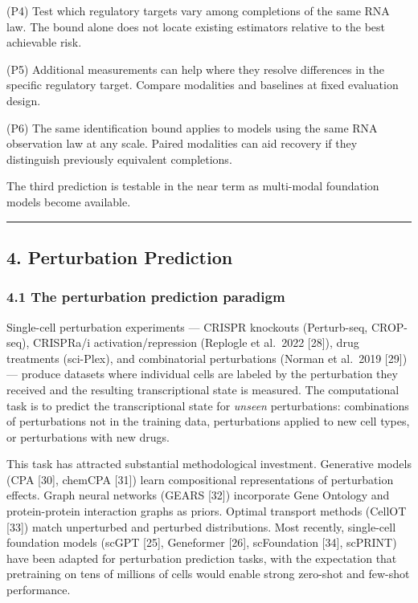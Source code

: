 \documentclass[
]{article}
\begin{document}
(P4) Test which regulatory targets vary among completions of the same
RNA law. The bound alone does not locate existing estimators relative to
the best achievable risk.

(P5) Additional measurements can help where they resolve differences in
the specific regulatory target. Compare modalities and baselines at
fixed evaluation design.

(P6) The same identification bound applies to models using the same RNA
observation law at any scale. Paired modalities can aid recovery if they
distinguish previously equivalent completions.

The third prediction is testable in the near term as multi-modal
foundation models become available.

\begin{center}\rule{0.5\linewidth}{0.5pt}\end{center}

\hypertarget{perturbation-prediction}{%
\subsection{4. Perturbation Prediction}\label{perturbation-prediction}}

\hypertarget{the-perturbation-prediction-paradigm}{%
\subsubsection{4.1 The perturbation prediction
paradigm}\label{the-perturbation-prediction-paradigm}}

Single-cell perturbation experiments --- CRISPR knockouts (Perturb-seq,
CROP-seq), CRISPRa/i activation/repression (Replogle et al.~2022
{[}28{]}), drug treatments (sci-Plex), and combinatorial perturbations
(Norman et al.~2019 {[}29{]}) --- produce datasets where individual
cells are labeled by the perturbation they received and the resulting
transcriptional state is measured. The computational task is to predict
the transcriptional state for \emph{unseen} perturbations: combinations
of perturbations not in the training data, perturbations applied to new
cell types, or perturbations with new drugs.

This task has attracted substantial methodological investment.
Generative models (CPA {[}30{]}, chemCPA {[}31{]}) learn compositional
representations of perturbation effects. Graph neural networks (GEARS
{[}32{]}) incorporate Gene Ontology and protein-protein interaction
graphs as priors. Optimal transport methods (CellOT {[}33{]}) match
unperturbed and perturbed distributions. Most recently, single-cell
foundation models (scGPT {[}25{]}, Geneformer {[}26{]}, scFoundation
{[}34{]}, scPRINT) have been adapted for perturbation prediction tasks,
with the expectation that pretraining on tens of millions of cells would
enable strong zero-shot and few-shot performance.
\end{document}
